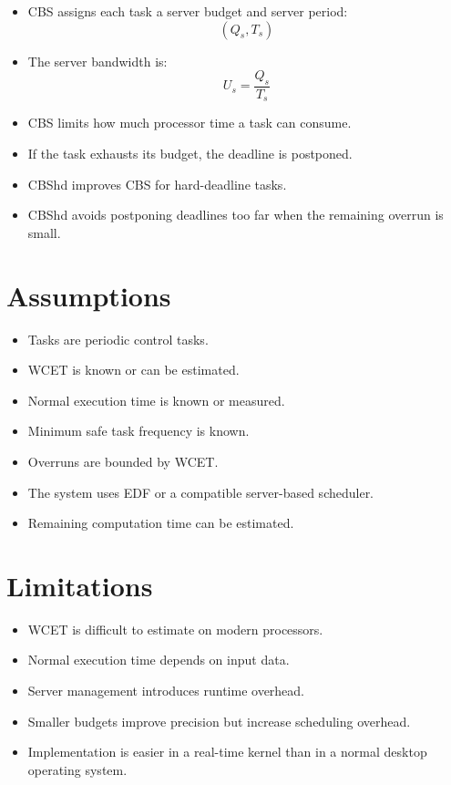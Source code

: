 \documentclass[a4paper,11pt]{article}
\begin{document}
\begin{itemize}
    \item CBS assigns each task a server budget and server period:
    \[
        (Q_s, T_s)
    \]
    \item The server bandwidth is:
    \[
        U_s = \frac{Q_s}{T_s}
    \]
    \item CBS limits how much processor time a task can consume.
    \item If the task exhausts its budget, the deadline is postponed.
    \item CBShd improves CBS for hard-deadline tasks.
    \item CBShd avoids postponing deadlines too far when the remaining overrun is small.
\end{itemize}

\section*{Assumptions}

\begin{itemize}
    \item Tasks are periodic control tasks.
    \item WCET is known or can be estimated.
    \item Normal execution time is known or measured.
    \item Minimum safe task frequency is known.
    \item Overruns are bounded by WCET.
    \item The system uses EDF or a compatible server-based scheduler.
    \item Remaining computation time can be estimated.
\end{itemize}

\section*{Limitations}

\begin{itemize}
    \item WCET is difficult to estimate on modern processors.
    \item Normal execution time depends on input data.
    \item Server management introduces runtime overhead.
    \item Smaller budgets improve precision but increase scheduling overhead.
    \item Implementation is easier in a real-time kernel than in a normal desktop operating system.
\end{itemize}
\end{document}
